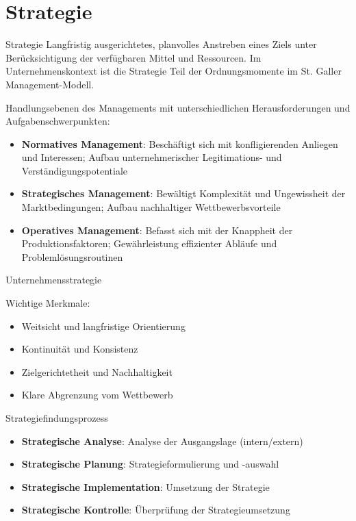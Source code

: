 \section{Strategie}

\begin{definition}{Strategie} 
Langfristig ausgerichtetes, planvolles Anstreben eines Ziels unter Berücksichtigung der verfügbaren Mittel und Ressourcen. Im Unternehmenskontext ist die Strategie Teil der Ordnungsmomente im St. Galler Management-Modell.
\end{definition}

\begin{concept}{Handlungsebenen des Managements}
mit unterschiedlichen Herausforderungen und Aufgabenschwerpunkten:
\begin{itemize}
    \item \textbf{Normatives Management}: Beschäftigt sich mit konfligierenden Anliegen und Interessen; Aufbau unternehmerischer Legitimations- und Verständigungspotentiale
    \item \textbf{Strategisches Management}: Bewältigt Komplexität und Ungewissheit der Marktbedingungen; Aufbau nachhaltiger Wettbewerbsvorteile
    \item \textbf{Operatives Management}: Befasst sich mit der Knappheit der Produktionsfaktoren; Gewährleistung effizienter Abläufe und Problemlösungsroutinen
\end{itemize}
\end{concept}

\begin{minipage}{0.4\linewidth}
\begin{theorem}
{Unternehmensstrategie}

Wichtige Merkmale:
\begin{itemize}
    \item Weitsicht und langfristige Orientierung
    \item Kontinuität und Konsistenz
    \item Zielgerichtetheit und Nachhaltigkeit
    \item Klare Abgrenzung vom Wettbewerb
\end{itemize}
\end{theorem}
\end{minipage}
\begin{minipage}{0.64\linewidth}

\begin{corollary}{Strategiefindungsprozess}
\begin{itemize}
    \item \textbf{Strategische Analyse}: Analyse der Ausgangslage (intern/extern)
    \item \textbf{Strategische Planung}: Strategieformulierung und -auswahl
    \item \textbf{Strategische Implementation}: Umsetzung der Strategie
    \item \textbf{Strategische Kontrolle}: Überprüfung der Strategieumsetzung
\end{itemize}
\end{corollary}
\end{minipage}

